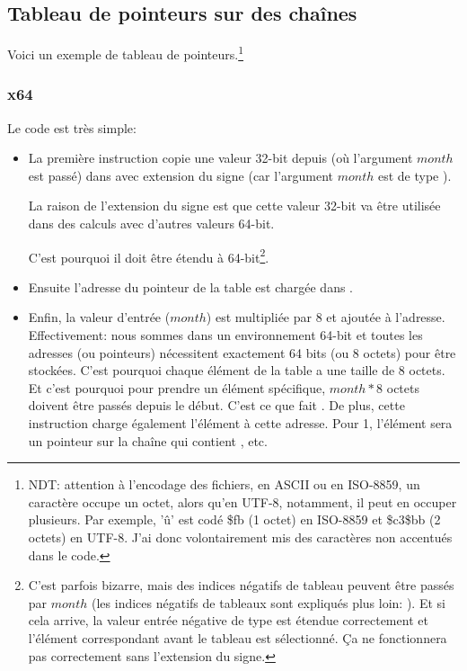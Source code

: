 ﻿\subsection{Tableau de pointeurs sur des chaînes}
\label{array_of_pointers_to_strings}

Voici un exemple de tableau de pointeurs.\footnote{NDT: attention à l'encodage des
fichiers, en ASCII ou en ISO-8859, un caractère occupe un octet, alors qu'en UTF-8,
notamment, il peut en occuper plusieurs. Par exemple, 'û' est codé \$fb (1 octet)
en ISO-8859 et \$c3\$bb (2 octets) en UTF-8. J'ai donc volontairement mis des caractères
non accentués dans le code.}



\subsubsection{x64}



Le code est très simple:

\begin{itemize}

\item
{}

La première instruction  copie une valeur 32-bit depuis \ECX (où l'argument
$month$ est passé) dans \RAX avec extension du signe (car l'argument $month$ est
de type \Tint).

La raison de l'extension du signe est que cette valeur 32-bit va être utilisée dans
des calculs avec d'autres valeurs 64-bit.

C'est pourquoi il doit être étendu à 64-bit\footnote{C'est parfois bizarre, mais des
indices négatifs de tableau peuvent être passés par $month$ (les indices négatifs
de tableaux sont expliqués plus loin: ).
Et si cela arrive, la valeur entrée négative de type \Tint est étendue correctement
et l'élément correspondant avant le tableau est sélectionné.
Ça ne fonctionnera pas correctement sans l'extension du signe.}.

\item
Ensuite l'adresse du pointeur de la table est chargée dans \RCX.

\item
Enfin, la valeur d'entrée ($month$) est multipliée par 8 et ajoutée à l'adresse.
Effectivement: nous sommes dans un environnement 64-bit et toutes les adresses (ou
pointeurs) nécessitent exactement 64 bits (ou 8 octets) pour être stockées.
C'est pourquoi chaque élément de la table a une taille de 8 octets.
Et c'est pourquoi pour prendre un élément spécifique, $month*8$ octets doivent être
passés depuis le début.
C'est ce que fait \MOV.
De plus, cette instruction charge également l'élément à cette adresse.
Pour 1, l'élément sera un pointeur sur la chaîne qui contient , etc.

\end{itemize}

